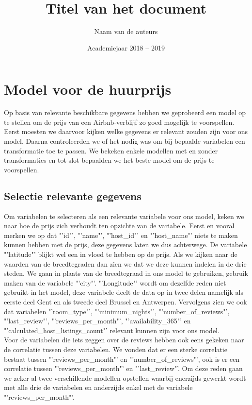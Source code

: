 \documentclass[a4paper,kulak]{kulakarticle} %
\date{Academiejaar 2018 -- 2019}
\title{Titel van het document}
\author{Naam van de auteurs}
\begin{document}
\maketitle

\section{Model voor de huurprijs}
Op basis van relevante beschikbare gegevens hebben we geprobeerd een model op te stellen om de prijs van een Airbnb-verblijf zo goed mogelijk te voorspellen. Eerst moesten we daarvoor kijken welke gegevens er relevant zouden zijn voor ons model. Daarna controleerden we of het nodig was om bij bepaalde variabelen een transformatie toe te passen. We bekeken enkele modellen met en zonder transformaties en tot slot bepaalden we het beste model om de prijs te voorspellen.
\subsection{Selectie relevante gegevens}
Om variabelen te selecteren als een relevante variabele voor ons model, keken we naar hoe de prijs zich verhoudt ten opzichte van de variabele. Eerst en vooral merken we op dat "'id"', "'name"', "'host\_id"' en "'host\_name"' niets te maken kunnen hebben met de prijs, deze gegevens laten we dus achterwege. De variabele "'latitude"' blijkt wel een in vloed te hebben op de prijs. Als we kijken naar de waarden van de breedtegraden dan zien we dat we deze kunnen indelen in de drie steden. We gaan in plaats van de breedtegraad in ons model te gebruiken, gebruik maken van de variabele "'city"'. "'Longitude"' wordt om dezelfde reden niet gebruikt in het model, deze variabele deelt de data op in twee delen namelijk als eerste deel Gent en als tweede deel Brussel en Antwerpen. Vervolgens zien we ook dat variabelen "'room\_type"', "'minimum\_nights"', "'number\_of\_reviews"', "'last\_review"', "'reviews\_per\_month"', "'availability\_365"' en "'calculated\_host\_listings\_count"' relevant kunnen zijn voor ons model. \\

Voor de variabelen die iets zeggen over de reviews hebben ook eens gekeken naar de correlatie tussen deze variabelen. We vonden dat er een sterke correlatie bestaat tussen "'reviews\_per\_month"' en "'number\_of\_reviews"', ook is er een correlatie tussen "'reviews\_per\_month"' en "'last\_review"'. Om deze reden gaan we zeker al twee verschillende modellen opstellen waarbij enerzijds gewerkt wordt met alle drie de variabelen en anderzijds enkel met de variabele "'reviews\_per\_month"'.
\end{document}

